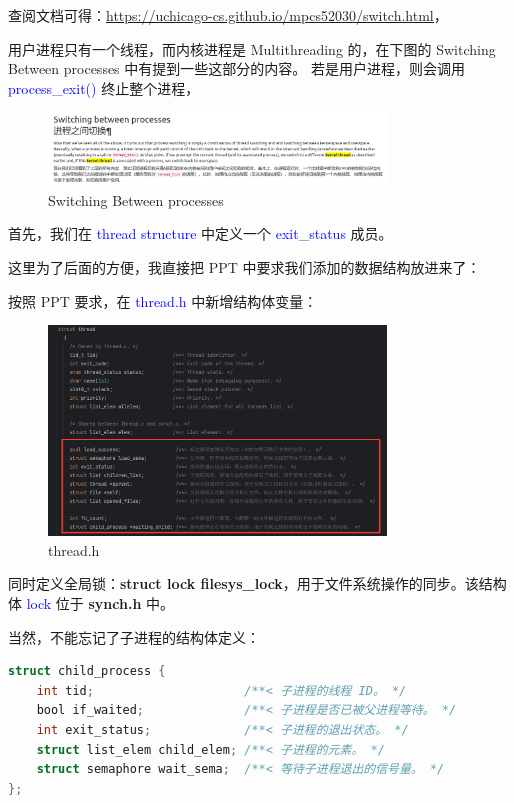 \documentclass[14pt,a4paper,UTF8,twoside]{article}
\renewcommand{\texttt}[1]{\textcolor{blue}{\ttfamily #1}}
\begin{document}
\begin{cth}
    查阅文档可得：\href{https://uchicago-cs.github.io/mpcs52030/switch.html}{\underline{https://uchicago-cs.github.io/mpcs52030/switch.html}}，
    
    用户进程只有一个线程，而内核进程是 Multithreading 的，在下图的 Switching Between processes 中有提到一些这部分的内容。
    若是用户进程，则会调用 \texttt{process\_exit()} 终止整个进程，
\end{cth}

\begin{figure}[H]
    \centering
    \includegraphics[width=0.8\textwidth]{img6/info1.png}
    \caption{Switching Between processes}
    \label{fig:lab6-3}    
\end{figure}

首先，我们在 \texttt{thread structure} 中定义一个 \texttt{exit\_status} 成员。

这里为了后面的方便，我直接把 PPT 中要求我们添加的数据结构放进来了：

按照 PPT 要求，在 \texttt{thread.h} 中新增结构体变量：

\begin{figure}[H]
    \centering
    \includegraphics[width=0.8\textwidth]{img5/new.png}
    \caption{thread.h}
    \label{fig:thread}
\end{figure}

同时定义全局锁：\textbf{struct lock filesys\_lock}，用于文件系统操作的同步。该结构体 \texttt{lock} 位于 \textbf{synch.h} 中。

当然，不能忘记了子进程的结构体定义：

\begin{lstlisting}[language=C,title= child\_process]
struct child_process {
    int tid;                     /**< 子进程的线程 ID。 */
    bool if_waited;              /**< 子进程是否已被父进程等待。 */
    int exit_status;             /**< 子进程的退出状态。 */
    struct list_elem child_elem; /**< 子进程的元素。 */
    struct semaphore wait_sema;  /**< 等待子进程退出的信号量。 */
};
\end{lstlisting}
\end{document}
